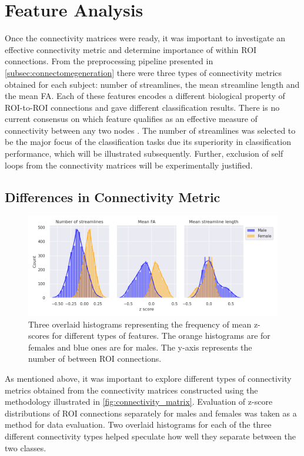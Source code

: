 \documentclass[msthesis.tex]{subfiles}
\begin{document}
\section{Feature Analysis}
\label{features}
Once the connectivity matrices were ready, it was important to investigate an effective connectivity metric and determine importance of within \gls{ROI} connections. From the preprocessing pipeline presented in \autoref{subsec:connectomegeneration} there were three types of connectivity metrics obtained for each subject: number of streamlines, the mean streamline length and the mean FA. Each of these features encodes a different biological property of ROI-to-ROI connections and gave different classification results. There is no current consensus on which feature qualifies as an effective measure of connectivity between any two nodes \citep{yeh2020mapping}. The number of streamlines was selected to be the major focus of the classification tasks due its superiority in classification performance, which will be illustrated subsequently. Further, exclusion of self loops from the connectivity matrices will be experimentally justified. 

\subsection{Differences in Connectivity Metric}
\label{subsec:connmetric}
\begin{figure}
    \centering
    \includegraphics[width=\textwidth]{images/zscoredist.png}
    \caption{Three overlaid histograms representing the frequency of mean z-scores for different types of features. The orange histograms are for females and blue ones are for males. The y-axis represents the number of between ROI connections.}
    \label{fig:hist_zscores}
\end{figure} 
As mentioned above, it was important to explore different types of connectivity metrics obtained from the connectivity matrices constructed using the methodology illustrated in \cref{fig:connectivity_matrix}. Evaluation of z-score distributions of \gls{ROI} connections separately for males and females was taken as a method for data evaluation. Two overlaid histograms for each of the three different connectivity types helped speculate how well they separate between the two classes.
\end{document}

